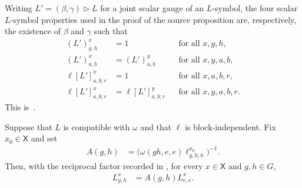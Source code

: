 \begin{definition}
    \label{def:mpug_block_independence_gauge_forms}
    \leanok
    Writing $L'=(\beta,\gamma)\mathbin{\triangleright}L$ for a joint scalar
    gauge of an $L$-symbol, the four scalar $L$-symbol properties used in the
    proof of the source proposition are, respectively, the existence of $\beta$
    and $\gamma$ such that
    \begin{align}
        (L')^x_{g,h}       & =1
                           &                     & \text{for all $x,g,h$},
        \label{eq:mpug_block_form_trivial}                                     \\
        (L')^x_{a,b}       & =(L')^y_{a,b}
                           &                     & \text{for all $x,y,a,b$},
        \label{eq:mpug_block_form_constant}                                    \\
        \ell[L']^x_{a,b;r} & =1
                           &                     & \text{for all $x,a,b,r$},
        \label{eq:mpug_block_form_trivial_ell}                                 \\
        \ell[L']^x_{a,b;r} & =\ell[L']^y_{a,b;r}
                           &                     & \text{for all $x,y,a,b,r$}.
        \label{eq:mpug_block_form_independent_ell}
    \end{align}
    This is~\cite[``Four scalar gauge formulations'']{QICLean2026Blueprint}.
\end{definition}

\begin{lemma}
    \label{thm:mpug_block_factorization}
    \leanok
    Suppose that $L$ is compatible with $\omega$ and that $\ell$ is
    block-independent. Fix $x_0\in\mathsf X$ and set
    \begin{align}
        A(g,h)
         & =\bigl(\omega(gh,e,e)\ell^{x_0}_{g,h;h}\bigr)^{-1}.
        \label{eq:mpug_block_factor}
    \end{align}
    Then, with the reciprocal factor recorded in
    \cite{gap:fbc25_block_independence_reciprocal_errors}, for every
    $x\in\mathsf X$ and $g,h\in G$,
    \begin{align}
        L^x_{g,h}
         & =A(g,h)L^x_{e,e}.
        \label{eq:mpug_corrected_block_factorization}
    \end{align}
\end{lemma}

